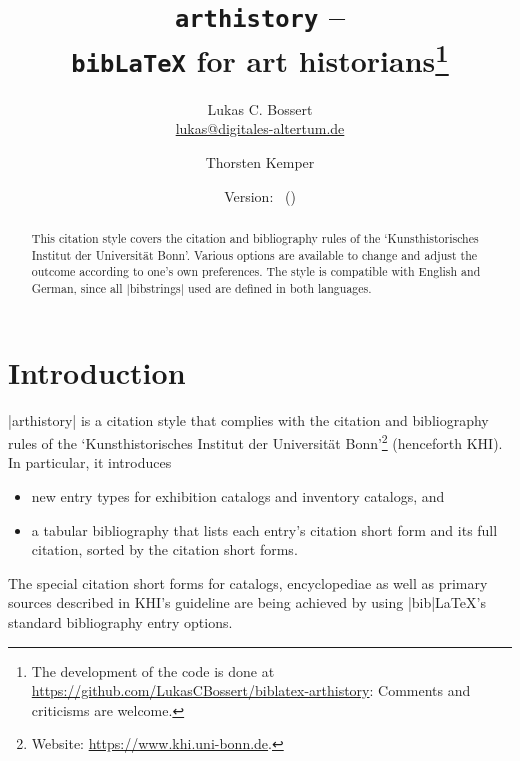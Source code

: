 \documentclass[a4paper,
10pt,
ngerman,
english
]{ltxdoc}
\begin{document}
\title{\texttt{arthistory} -- \\\texttt{bib\LaTeX} for art historians\footnote{The development of the code is done at \url{https://github.com/LukasCBossert/biblatex-arthistory}: 
Comments and criticisms are welcome.}}

\author{Lukas C. Bossert\protect\\%
{\small \href{mailto:lukas@digitales-altertum.de}{lukas@digitales-altertum.de}}
 \and Thorsten Kemper}
 
\date{Version: \arthistoryversion\ (\arthistorydate)
} 
\maketitle
 
 \begin{abstract}
\noindent This citation style covers the citation and bibliography rules of the \enquote*{Kunsthistorisches Institut der Universität Bonn}.
Various options are available to change and adjust the outcome according to one's own preferences. 
The style is compatible with English and German, since all |bibstrings| used are defined in both languages.
 \end{abstract}


\begin{multicols}{2}
\footnotesize\parskip=0mm \tableofcontents
\end{multicols}

\section{Introduction}
|arthistory| is a citation style that complies with the citation and bibliography rules of the \enquote*{Kunsthistorisches Institut der Universität Bonn}\footnote{Website: \url{https://www.khi.uni-bonn.de}.} (henceforth KHI). In particular, it introduces
\begin{itemize}
	\item new entry types for exhibition catalogs and inventory catalogs, and
	\item a tabular bibliography that lists each entry's citation short form and its full citation, sorted by the citation short forms.
\end{itemize}
The special citation short forms for catalogs, encyclopediae as well as primary sources described in KHI's guideline are being achieved by using |bib|\LaTeX 's standard bibliography entry options.
\end{document}
